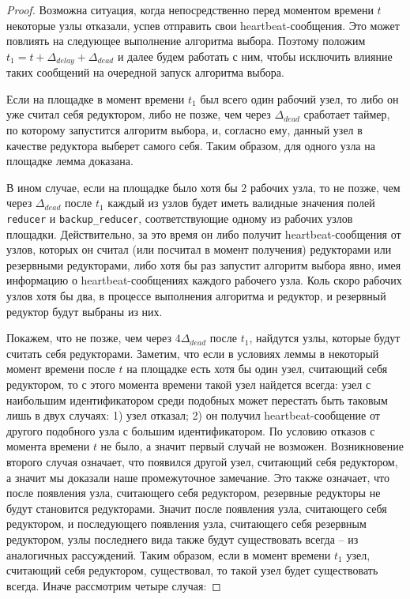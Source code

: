 \documentclass{article}
\theoremstyle{plain}
\theoremstyle{plain}
\theoremstyle{plain}
\theoremstyle{plain}
\theoremstyle{definition}
\theoremstyle{remark}
\theoremstyle{plain}
\begin{document}
\begin{proof}
    Возможна ситуация, когда непосредственно перед моментом времени $t$ некоторые узлы отказали, успев отправить свои heartbeat-сообщения. Это может повлиять на следующее выполнение алгоритма выбора. Поэтому положим $t_1 = t + \Delta_{delay} + \Delta_{dead}$ и далее будем работать с ним, чтобы исключить влияние таких сообщений на очередной запуск алгоритма выбора.

    Если на площадке в момент времени $t_1$ был всего один рабочий узел, то либо он уже считал себя редуктором, либо не позже, чем через $\Delta_{dead}$ сработает таймер, по которому запустится алгоритм выбора, и, согласно ему, данный узел в качестве редуктора выберет самого себя. Таким образом, для одного узла на площадке лемма доказана.
    
    В ином случае, если на площадке было хотя бы 2 рабочих узла, то не позже, чем через $\Delta_{dead}$ после $t_1$ каждый из узлов будет иметь валидные значения полей \texttt{reducer} и \texttt{backup\_reducer}, соответствующие одному из рабочих узлов площадки. Действительно, за это время он либо получит heartbeat-сообщения от узлов, которых он считал (или посчитал в момент получения) редукторами или резервными редукторами, либо хотя бы раз запустит алгоритм выбора явно, имея информацию о heartbeat-сообщениях каждого рабочего узла. Коль скоро рабочих узлов хотя бы два, в процессе выполнения алгоритма и редуктор, и резервный редуктор будут выбраны из них.
    
    Покажем, что не позже, чем через $4\Delta_{dead}$ после $t_1$, найдутся узлы, которые будут считать себя редукторами. Заметим, что если в условиях леммы в некоторый момент времени после $t$ на площадке есть хотя бы один узел, считающий себя редуктором, то с этого момента времени такой узел найдется всегда: узел с наибольшим идентификатором среди подобных может перестать быть таковым лишь в двух случаях: 1) узел отказал; 2) он получил heartbeat-сообщение от другого подобного узла с большим идентификатором. По условию отказов с момента времени $t$ не было, а значит первый случай не возможен. Возникновение второго случая означает, что появился другой узел, считающий себя редуктором, а значит мы доказали наше промежуточное замечание. Это также означает, что после появления узла, считающего себя редуктором, резервные редукторы не будут становится редукторами. Значит после появления узла, считающего себя редуктором, и последующего появления узла, считающего себя резервным редуктором, узлы последнего вида также будут существовать всегда -- из аналогичных рассуждений. Таким образом, если в момент времени $t_1$ узел, считающий себя редуктором, существовал, то такой узел будет существовать всегда. Иначе рассмотрим четыре случая:
    

\end{proof}
\end{document}
